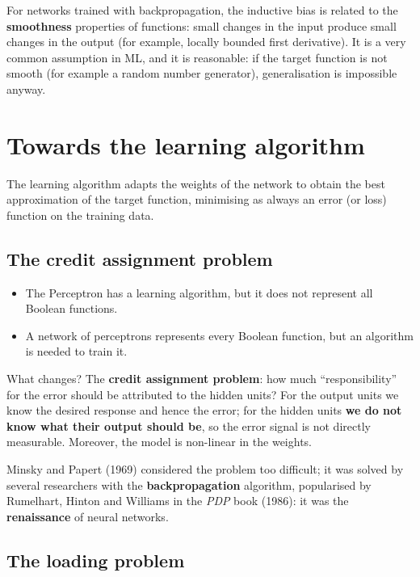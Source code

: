 For networks trained with backpropagation, the inductive bias is
related to the \textbf{smoothness} properties of functions: small
changes in the input produce small changes in the output (for example,
locally bounded first derivative). It is a very common assumption in
ML, and it is reasonable: if the target function is not smooth (for
example a random number generator), generalisation is impossible
anyway.

\section{Towards the learning
algorithm}\label{verso-lalgoritmo-di-apprendimento}

The learning algorithm adapts the weights of the network to obtain the
best approximation of the target function, minimising as always an
error (or loss) function on the training data.

\subsection{The credit assignment
problem}\label{il-problema-del-credit-assignment}

\begin{itemize}
\tightlist
\item
  The Perceptron has a learning algorithm, but it does not represent
  all Boolean functions.
\item
  A network of perceptrons represents every Boolean function, but an
  algorithm is needed to train it.
\end{itemize}

What changes? The \textbf{credit assignment problem}: how much
``responsibility'' for the error should be attributed to the hidden
units? For the output units we know the desired response and hence the
error; for the hidden units \textbf{we do not know what their output
should be}, so the error signal is not directly measurable. Moreover,
the model is non-linear in the weights.

Minsky and Papert (1969) considered the problem too difficult; it was
solved by several researchers with the \textbf{backpropagation}
algorithm, popularised by Rumelhart, Hinton and Williams in the
\emph{PDP} book (1986): it was the \textbf{renaissance} of neural
networks.

\subsection{The loading problem}\label{il-loading-problem}

